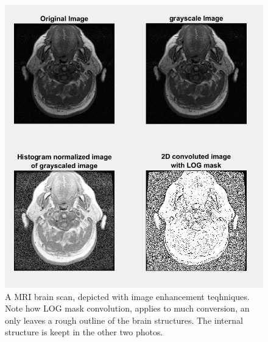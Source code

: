 \documentclass[]{article}
\begin{document}
\begin{figure}[H]
\centering
\includegraphics[scale=0.75]{brain.PNG}
\caption{A MRI brain scan, depicted with image enhancement teqhniques. Note how LOG mask convolution, applies to much conversion, an only leaves a rough outline of the brain structures. The internal structure is keept in the other two photos.}
\end{figure}

\newpage
\end{document}
